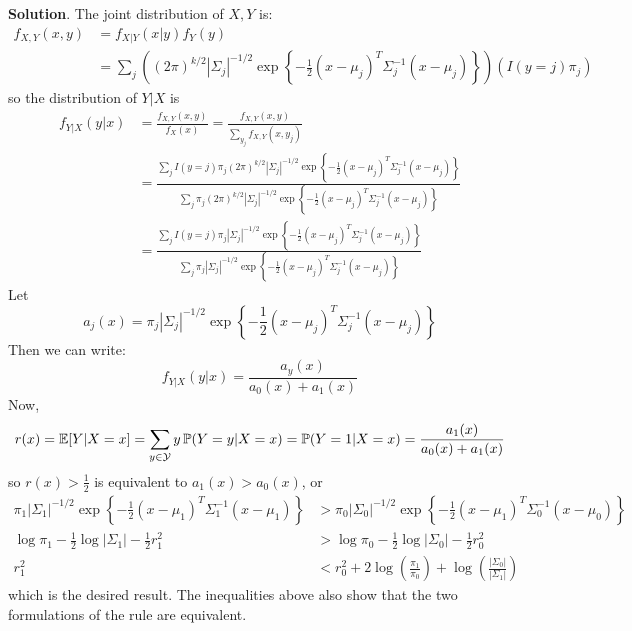 \textbf{Solution}. The joint distribution of \(X, Y\) is:
\begin{align*}
f_{X, Y}(x, y) &= f_{X | Y}(x | y) f_Y(y) \\
&= \sum_{j} \left( (2 \pi)^{k / 2} |\Sigma_{j}|^{-1/2} \exp \left\{ -\frac{1}{2} (x - \mu_{j})^T \Sigma_{j}^{-1} (x - \mu_{j}) \right\} \right) \left( I(y = j) \pi_{j} \right)
\end{align*}
so the distribution of \(Y | X\) is
\begin{align*}
f_{Y | X}(y | x) &= \frac{f_{X, Y}(x, y)}{f_X(x)} = \frac{f_{X, Y}(x, y)}{\sum_{y_{j}} f_{X, Y}(x, y_{j})} \\
&= \frac{\sum_{j} I(y = j) \pi_{j} (2 \pi)^{k / 2} |\Sigma_{j}|^{-1/2} \exp \left\{ -\frac{1}{2} (x - \mu_{j})^T \Sigma_{j}^{-1} (x - \mu_{j}) \right\}}{\sum_{j} \pi_{j} (2 \pi)^{k / 2} |\Sigma_{j}|^{-1/2} \exp \left\{ -\frac{1}{2} (x - \mu_{j})^T \Sigma_{j}^{-1} (x - \mu_{j}) \right\}} \\
&= \frac{\sum_{j} I(y = j) \pi_{j} |\Sigma_{j}|^{-1/2} \exp \left\{ -\frac{1}{2} (x - \mu_{j})^T \Sigma_{j}^{-1} (x - \mu_{j}) \right\}}{\sum_{j} \pi_{j} |\Sigma_{j}|^{-1/2} \exp \left\{ -\frac{1}{2} (x - \mu_{j})^T \Sigma_{j}^{-1} (x - \mu_{j}) \right\}}
\end{align*}
Let
\[
a_{j}(x) = \pi_{j} |\Sigma_{j}|^{-1/2} \exp \left\{ -\frac{1}{2} (x - \mu_{j})^T \Sigma_{j}^{-1} (x - \mu_{j}) \right\}
\]
Then we can write:
\[
f_{Y | X}(y | x) = \frac{a_y(x)}{a_{0}(x) + a_{1}(x)}
\]
Now,
\[
r(x) = \operatorname{\mathbb{E}}[Y | X = x] = \sum_{y \in \mathcal{Y}} y \operatorname{\mathbb{P}}(Y = y | X = x) = \operatorname{\mathbb{P}}(Y = 1 | X = x) = \frac{a_{1}(x)}{a_{0}(x) + a_{1}(x)}
\]
so \(r(x) > \frac{1}{2}\) is equivalent to \(a_{1}(x) > a_{0}(x)\), or
\begin{align*}
\pi_{1} |\Sigma_{1}|^{-1/2} \exp \left\{ -\frac{1}{2} (x - \mu_{1})^T \Sigma_{1}^{-1} (x - \mu_{1}) \right\}
&>
\pi_{0} |\Sigma_{0}|^{-1/2} \exp \left\{ -\frac{1}{2} (x - \mu_{1})^T \Sigma_{0}^{-1} (x - \mu_{0}) \right\} \\
\log \pi_{1} - \frac{1}{2} \log |\Sigma_{1}| - \frac{1}{2} r_{1}^{2}
&>
\log \pi_{0} - \frac{1}{2} \log |\Sigma_{0}| -\frac{1}{2} r_{0}^{2} \\
r_{1}^{2} &< r_{0}^{2} + 2 \log \left( \frac{\pi_{1}}{\pi_{0}} \right) + \log \left( \frac{| \Sigma_{0} | }{ | \Sigma_{1}| }
\right)
\end{align*}
which is the desired result. The inequalities above also show that the
two formulations of the rule are equivalent.

